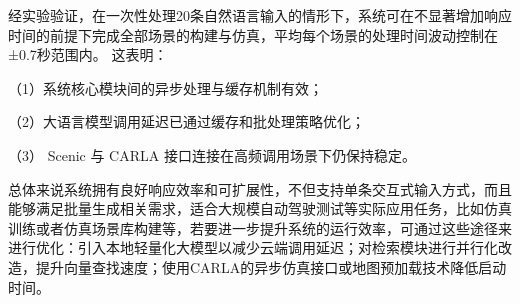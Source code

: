 经实验验证，在一次性处理20条自然语言输入的情形下，系统可在不显著增加响应时间的前提下完成全部场景的构建与仿真，平均每个场景的处理时间波动控制在±0.7秒范围内。
这表明：

（1）系统核心模块间的异步处理与缓存机制有效；

（2）大语言模型调用延迟已通过缓存和批处理策略优化；

（3） Scenic 与 CARLA 接口连接在高频调用场景下仍保持稳定。

总体来说系统拥有良好响应效率和可扩展性，不但支持单条交互式输入方式，而且能够满足批量生成相关需求，适合大规模自动驾驶测试等实际应用任务，比如仿真训练或者仿真场景库构建等，若要进一步提升系统的运行效率，可通过这些途径来进行优化：引入本地轻量化大模型以减少云端调用延迟；对检索模块进行并行化改造，提升向量查找速度；使用CARLA的异步仿真接口或地图预加载技术降低启动时间。
















